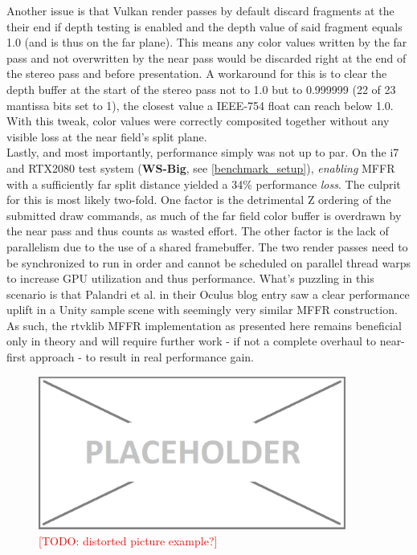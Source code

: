 Another issue is that Vulkan render passes by default discard fragments at the their end if depth testing is enabled and the depth value of said fragment equals 1.0 (and is thus on the far plane). This means any color values written by the far pass and not overwritten by the near pass would be discarded right at the end of the stereo pass and before presentation. A workaround for this is to clear the depth buffer at the start of the stereo pass not to 1.0 but to 0.999999 (22 of 23 mantissa bits set to 1), the closest value a IEEE-754 float can reach below 1.0. With this tweak, color values were correctly composited together without any visible loss at the near field's split plane. \\
Lastly, and most importantly, performance simply was not up to par. On the i7 and RTX2080 test system (\textbf{WS-Big}, see \autoref{benchmark_setup}), \textit{enabling} MFFR with a sufficiently far split distance yielded a 34\% performance \textit{loss}. The culprit for this is most likely two-fold. One factor is the detrimental Z ordering of the submitted draw commands, as much of the far field color buffer is overdrawn by the near pass and thus counts as wasted effort. The other factor is the lack of parallelism due to the use of a shared framebuffer. The two render passes need to be synchronized to run in order and cannot be scheduled on parallel thread warps to increase GPU utilization and thus performance. What's puzzling in this scenario is that Palandri et al. in their Oculus blog entry\cite{Palandri.2016} saw a clear performance uplift in a Unity sample scene with seemingly very similar MFFR construction. \\
As such, the rtvklib MFFR implementation as presented here remains beneficial only in theory and will require further work - if not a complete overhaul to near-first approach - to result in real performance gain. 

\begin{figure}[htb]
  \centering
  \includegraphics[width=0.9\textwidth]{pictures/placeholder}
  \caption{\textcolor{red}{[TODO: distorted picture example?]}} \label{fig:blob}
\end{figure}

